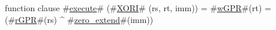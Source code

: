function clause #\hyperref[zexecute]{execute}# (#\hyperref[zXORI]{XORI}# (rs, rt, imm)) =
  {
    #\hyperref[zwGPR]{wGPR}#(rt) = (#\hyperref[zrGPR]{rGPR}#(rs) ^ #\hyperref[zzzerozyextend]{zero\_extend}#(imm))
  }
